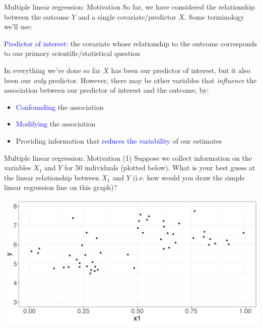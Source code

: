 \documentclass[10pt,t]{beamer}
\begin{document}
\begin{frame}{Multiple linear regression: Motivation}
So far, we have considered the relationship between the outcome $Y$ and a single covariate/predictor $X$. Some terminology we'll use:

\vspace{0.3cm}

\textcolor{blue}{Predictor of interest}: the covariate whose relationship to the outcome corresponds to our primary scientific/statistical question \pause

\vspace{0.3cm}

In everything we've done so far $X$ has been our predictor of interest, but it also been our \textit{only} predictor. However, there may be other variables that \textit{influence} the association between our predictor of interest and the outcome, by:

\vspace{0.3cm}

\begin{itemize}
	\item \textcolor{blue}{Confounding} the association
	\item \textcolor{blue}{Modifying} the association
	\item Providing information that \textcolor{blue}{reduces the variability} of our estimates
\end{itemize}

\end{frame}

\begin{frame}{Multiple linear regression: Motivation}
(1) Suppose we collect information on the variables $X_1$ and $Y$ for 50 individuals (plotted below). What is your best guess at the linear relationship between $X_1$ and $Y$ (i.e. how would you draw the simple linear regression line on this graph)?

\vspace{0.3cm}

\centering \includegraphics[scale=0.3]{multreg1.png}
\end{frame}
\end{document}
